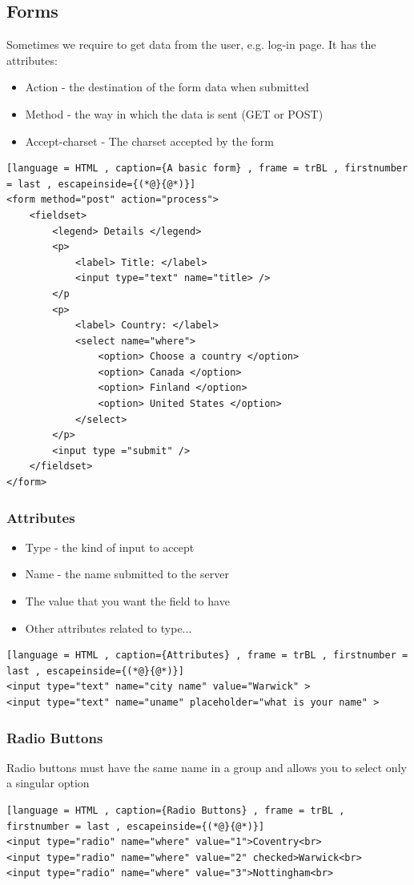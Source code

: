 \documentclass[a4paper]{article}
\theoremstyle{plain}
\theoremstyle{definition}
\theoremstyle{remark}
\begin{document}
\begin{flushleft}
\subsection{Forms}
Sometimes we require to get data from the user, e.g. log-in page. It has the attributes:	
\begin{itemize}
	\item Action - the destination of the form data when submitted
	\item Method - the way in which the data is sent (GET or POST)
	\item Accept-charset - The charset accepted by the form
\end{itemize}
\begin{lstlisting}[language = HTML , caption={A basic form} , frame = trBL , firstnumber = last , escapeinside={(*@}{@*)}]
<form method="post" action="process">
	<fieldset>
		<legend> Details </legend>
		<p>
			<label> Title: </label>
			<input type="text" name="title> />
		</p
		<p>
			<label> Country: </label>
			<select name="where">
				<option> Choose a country </option>
				<option> Canada </option>
				<option> Finland </option>
				<option> United States </option>
			</select>
		</p>
		<input type ="submit" />
	</fieldset>
</form>
\end{lstlisting}
\subsubsection{Attributes}
\begin{itemize}
	\item Type - the kind of input to accept
	\item Name - the name submitted to the server
	\item The value that you want the field to have
	\item Other attributes related to type...
\end{itemize}
\begin{lstlisting}[language = HTML , caption={Attributes} , frame = trBL , firstnumber = last , escapeinside={(*@}{@*)}]
<input type="text" name="city name" value="Warwick" >
<input type="text" name="uname" placeholder="what is your name" >
\end{lstlisting}
\subsubsection{Radio Buttons}
Radio buttons must have the same name in a group and allows you to select only a singular option
\begin{lstlisting}[language = HTML , caption={Radio Buttons} , frame = trBL , firstnumber = last , escapeinside={(*@}{@*)}]
<input type="radio" name="where" value="1">Coventry<br>
<input type="radio" name="where" value="2" checked>Warwick<br>
<input type="radio" name="where" value="3">Nottingham<br>
\end{lstlisting}

\end{flushleft}
\end{document}
